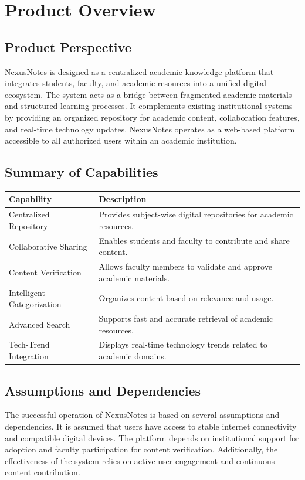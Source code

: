 \documentclass[12pt,a4paper]{report}
\begin{document}
\chapter{Product Overview}

\section{Product Perspective}
NexusNotes is designed as a centralized academic knowledge platform that integrates students, faculty, and academic resources into a unified digital ecosystem. The system acts as a bridge between fragmented academic materials and structured learning processes. It complements existing institutional systems by providing an organized repository for academic content, collaboration features, and real-time technology updates. NexusNotes operates as a web-based platform accessible to all authorized users within an academic institution.

\section{Summary of Capabilities}

\begin{center}
\begin{tabular}{|l|p{8cm}|}
\hline
Capability & Description \\
\hline
Centralized Repository & Provides subject-wise digital repositories for academic resources. \\
\hline
Collaborative Sharing & Enables students and faculty to contribute and share content. \\
\hline
Content Verification & Allows faculty members to validate and approve academic materials. \\
\hline
Intelligent Categorization & Organizes content based on relevance and usage. \\
\hline
Advanced Search & Supports fast and accurate retrieval of academic resources. \\
\hline
Tech-Trend Integration & Displays real-time technology trends related to academic domains. \\
\hline
\end{tabular}
\end{center}

\section{Assumptions and Dependencies}
The successful operation of NexusNotes is based on several assumptions and dependencies. It is assumed that users have access to stable internet connectivity and compatible digital devices. The platform depends on institutional support for adoption and faculty participation for content verification. Additionally, the effectiveness of the system relies on active user engagement and continuous content contribution.
\end{document}

